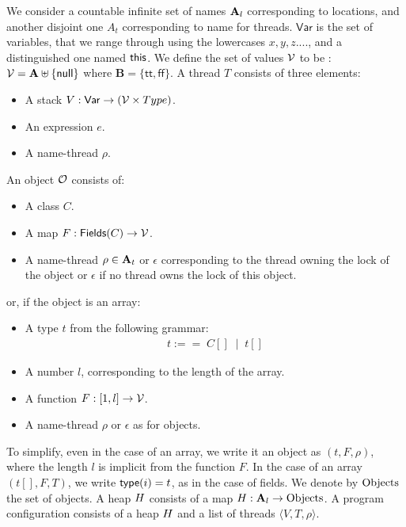 \documentclass[a4paper, 11pt, english]{article}
\newcommand{\Var}{\mathsf{Var}}
\begin{document}
We consider a countable infinite set of names $\mathbf{A}_l$ corresponding to locations, and another disjoint one $A_t$ corresponding to name for threads. $\Var$ is the set of variables, that we range through using the lowercases $x, y, z....$, and a distinguished one named $\mathsf{this}$.  We define the set of values $\mathcal{V}$ to be :
$\mathcal{V} = \mathbf{A} \uplus \{ \mathsf{null} \}$ where $\mathbf{B} = \{\mathsf{tt}, \mathsf{ff}\}$. A thread $T$ consists of three elements:
\begin{itemize}
\item A stack $V : \Var \rightarrow (\Value \times Type)$.
\item An expression $e$.
\item A name-thread $\rho$.
\end{itemize}
An object $\mathcal{O}$ consists of:
\begin{itemize}
\item A class $C$.
\item A map $F : \mathsf{Fields}(C) \rightarrow \mathcal{V}$.
\item A name-thread $\rho \in \mathbf{A}_t$ or $\epsilon$ corresponding to the thread owning the lock of the object or $\epsilon$ if no thread owns the lock of this object.
\end{itemize}
or, if the object is an array:
\begin{itemize}
\item A type $t$ from the following grammar:
\begin{align*}
t :== \; C[] \; \mid \; t[]
\end{align*}
\item A number $l$, corresponding to the length of the array.
\item A function $F : [1, l] \rightarrow \mathcal{V}$.
\item A name-thread $\rho$ or $\epsilon$ as for objects.
\end{itemize}
To simplify, even in the case of an array, we write it an object as $(t, F, \rho)$, where the length $l$ is implicit from the function $F$. In the case of an array $(t[], F, T)$, we write $\mathsf{type}(i) = t$, as in the case of fields.  We denote by $\mathrm{Objects}$ the set of objects.  A heap $H$ consists of a map $H : \mathbf{A}_l \rightarrow  \mathrm{Objects}$. A program configuration consists of a heap $H$ and a list of threads $\langle V, T, \rho \rangle$.

\newcommand{\nullException}{\mathsf{NullPointerExp}}
\newcommand{\exception}{\mathsf{Exp}}
\newcommand{\castException}{\mathsf{CastException}}
\newcommand{\ArrayException}{\mathsf{OutOfRangeException}}
\end{document}
